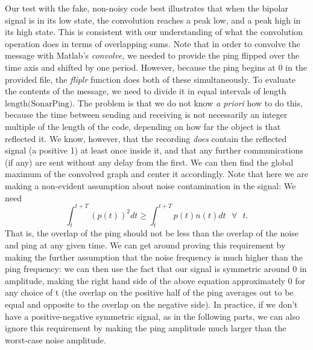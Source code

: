 \documentclass{article}
\begin{document}
	Our test with the fake, non-noisy code best illustrates that when the bipolar signal is in its low state, the convolution reaches a peak low, and a peak high in its high state. This is consistent with our understanding of what the convolution operation does in terms of overlapping sums.
	Note that in order to convolve the message with Matlab's \emph{convolve}, we needed to provide the ping flipped over the time axis and shifted by one period. However, because the ping begins at 0 in the provided file, the \emph{fliplr} function does both of these simultaneously.
	To evaluate the contents of the message, we need to divide it in equal intervals of length $\text{length(SonarPing)}$.
	The problem is that we do not know \emph{a priori} how to do this, because the time between sending and receiving is not necessarily an integer multiple of the length of the code, depending on how far the object is that reflected it.
	We know, however, that the recording \emph{does} contain the reflected signal (a positive 1) at least once inside it, and that any further communications (if any) are sent without any delay from the first. We can then find the global maximum of the convolved graph and center it accordingly.
	Note that here we are making a non-evident assumption about noise contamination in the signal: We need
	\[
	\int_{t}^{t+T}(p(t))^2dt \geq \int_{t}^{t+T}p(t)n(t)dt \text{  } \forall \text{  } t
	.\] 
That is, the overlap of the ping should not be less than the overlap of the noise and ping at any given time.
We can get around proving this requirement by making the further assumption that the noise frequency is much higher than the ping frequency:
we can then use the fact that our signal is symmetric around 0 in amplitude, making the right hand side of the above equation approximately 0 for any choice of t 
(the overlap on the positive half of the ping averages out to be equal and opposite to the overlap on the negative side).
In practice, if we don't have a positive-negative symmetric signal, as in the following parts, we can also ignore this requirement by making the ping amplitude much larger than the worst-case noise amplitude.
\end{document}
